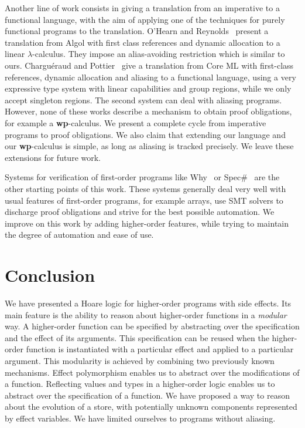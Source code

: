 \documentclass[a4paper]{llncs}
\newcommand{\wpre}{{\bf wp}}
\begin{document}
Another line of work consists in giving a translation from an imperative to a
functional language, with the aim of applying one of the techniques for purely
functional programs to the translation. O'Hearn and
Reynolds~\cite{ohearn-reynolds-00} present a translation from Algol with first
class references and dynamic allocation to a linear $\lambda$-calculus. They
impose an alias-avoiding restriction which is similar to ours. Charguéraud and
Pottier~\cite{chargueraud-pottier-08} give a translation from Core ML with
first-class references, dynamic allocation and aliasing to a functional
language, using a very expressive type system with linear capabilities and
group regions, while we only accept singleton regions. The second system can
deal with aliasing programs. However, none of these works describe a mechanism
to obtain proof obligations, for example a \wpre-calculus.  We present a
complete cycle from imperative programs to proof obligations. We also claim
that extending our language and our \wpre-calculus is simple, as long as
aliasing is tracked precisely.  We leave these extensions for future work.

Systems for verification of first-order programs like
Why~\cite{Filliatre00a,filliatre07cav} or Spec\#~\cite{BarnettLS04} are the
other starting points of this work. These systems generally deal very well
with usual features of first-order programs, for example arrays, use SMT
solvers to discharge proof obligations and strive for the best possible
automation. We improve on this work by adding higher-order features,
while trying to maintain the degree of automation and ease of use.

\section{Conclusion}
\label{sec:conclusion}

We have presented a Hoare logic for higher-order programs with side
effects. Its main feature is the ability to reason about higher-order
functions in a {\em modular} way. A higher-order function can be
specified by abstracting over the specification and the effect of its
arguments. This specification can be reused when the higher-order
function is instantiated with a particular effect and applied to a
particular argument. This modularity is achieved by combining two
previously known mechanisms. Effect polymorphism enables us to
abstract over the modifications of a function. Reflecting values and
types in a higher-order logic enables us to abstract over the
specification of a function. We have proposed a way to
reason about the evolution of a store, with potentially unknown
components represented by effect variables. We have limited ourselves to
programs without aliasing.
\end{document}
